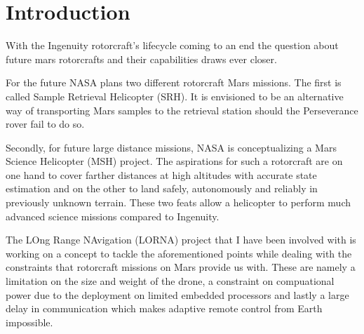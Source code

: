 \chapter{Introduction}
\label{sec:introduction}

With the Ingenuity rotorcraft's lifecycle coming to an end the question about future mars rotorcrafts and their capabilities draws ever closer.

For the future NASA plans two different rotorcraft Mars missions. The first is called Sample Retrieval Helicopter (SRH). It is envisioned to be an alternative way of transporting Mars samples to the retrieval station should the Perseverance rover fail to do so.

Secondly, for future large distance missions, NASA is conceptualizing a Mars Science Helicopter (MSH) project. The aspirations for such a rotorcraft are on one hand to cover farther distances at high altitudes with accurate state estimation and on the other to land safely, autonomously and reliably in previously unknown terrain. These two feats allow a helicopter to perform much advanced science missions compared to Ingenuity. 

The LOng Range NAvigation (LORNA) project that I have been involved with is working on a concept to tackle the aforementioned points while dealing with the constraints that rotorcraft missions on Mars provide us with. These are namely a limitation on the size and weight of the drone, a constraint on compuational power due to the deployment on limited embedded processors and lastly a large delay in communication which makes adaptive remote control from Earth impossible.



